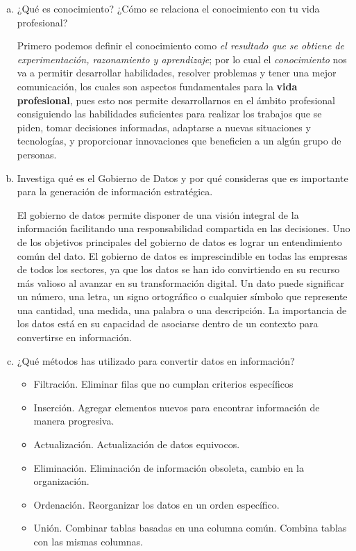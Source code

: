 \documentclass[12pt]{article}
\begin{document}
\begin{enumerate}[a.]
\item ¿Qué es conocimiento? ¿Cómo se relaciona el conocimiento con tu vida profesional?

Primero podemos definir el conocimiento como \textit{el resultado que se obtiene de experimentación, razonamiento y aprendizaje}; por lo cual el \textit{conocimiento} nos va a permitir desarrollar habilidades, resolver problemas y tener una mejor comunicación, los cuales son aspectos fundamentales para la \textbf{vida profesional}, pues esto nos permite desarrollarnos en el ámbito profesional consiguiendo las habilidades suficientes para realizar los trabajos que se piden, tomar decisiones informadas, adaptarse a nuevas situaciones y tecnologías, y proporcionar innovaciones que beneficien a un algún grupo de personas. 


\item Investiga qué es el Gobierno de Datos y por qué consideras que es importante para la generación de
información estratégica.\newline

El gobierno de datos permite disponer de una visión integral de la información facilitando una responsabilidad compartida en las decisiones. Uno de los objetivos principales del gobierno de datos es lograr un entendimiento común del dato. El gobierno de datos es imprescindible en todas las empresas de todos los sectores, ya que los datos se han ido convirtiendo en su recurso más valioso al avanzar en su transformación digital. Un dato puede significar un número, una letra, un signo ortográfico o cualquier símbolo que represente una cantidad, una medida, una palabra o una descripción. La importancia de los datos está en su capacidad de asociarse dentro de un contexto para convertirse en información.

\item ¿Qué métodos has utilizado para convertir datos en información?
\begin{itemize}
\item Filtración. Eliminar filas que no cumplan criterios específicos
\item Inserción. Agregar elementos nuevos para encontrar información de manera progresiva.
\item Actualización. Actualización de datos equivocos.
\item Eliminación. Eliminación de información obsoleta, cambio en la organización.
\item Ordenación. Reorganizar los datos en un orden específico.
\item Unión. Combinar tablas basadas en una columna común. Combina tablas con las mismas columnas.
\end{itemize}
\end{enumerate}
\end{document}
